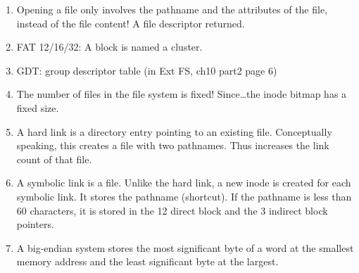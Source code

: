 \documentclass[]{report}
\begin{document}
\begin{enumerate}
		\item Opening a file only involves the pathname and the attributes of the file, instead of the file content! A file descriptor returned.
		\item FAT 12/16/32: A block is named a cluster.
		\item GDT: group descriptor table (in Ext FS, ch10 part2 page 6)
		\item The number of files in the file system is fixed! Since\dots the inode bitmap has a fixed size.
		\item A hard link is a directory entry pointing to an existing file. Conceptually speaking, this creates a file with two pathnames. Thus increases the link count of that file.
		\item A symbolic link is a file. Unlike the hard link, a new inode is created for each symbolic link. It stores the pathname (shortcut). If the pathname is less than 60 characters, it is stored in the 12 direct block and the 3 indirect block pointers.
		\item A big-endian system stores the most significant byte of a word at the smallest memory address and the least significant byte at the largest.
	\end{enumerate}
\end{document}

